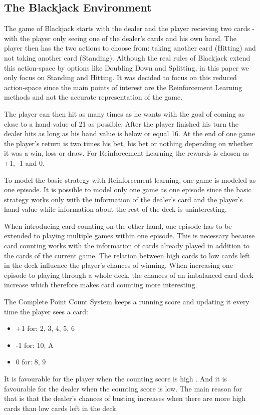 \documentclass[conference]{IEEEtran}
\begin{document}
\subsection{The Blackjack Environment}
The game of Blackjack starts with the dealer and the player recieving two cards - with the player only seeing one of the dealer's cards and his own hand.
The player then has the two actions to choose from: taking another card (Hitting) and not taking another card (Standing). 
Although the real rules of Blackjack extend this action-space by options like Doubling Down and Splitting, in this paper we only focus on Standing and Hitting. 
It was decided to focus on this reduced action-space since the main points of interest are the Reinforcement Learning methods and not the accurate representation of the game. 

The player can then hit as many times as he wants with the goal of coming as close to a hand value of 21 as possible.
After the player finished his turn the dealer hits as long as his hand value is below or equal 16.
At the end of one game the player's return is two times his bet, his bet or nothing depending on whether it was a win, loss or draw. 
For Reinforcement Learning the rewards is chosen as +1, -1 and 0. 

To model the basic strategy with Reinforcement learning, one game is modeled as one episode. 
It is possible to model only one game as one episode since the basic strategy works only with the information of the dealer's card and the player's hand value while information about the rest of the deck is uninteresting.

When introducing card counting on the other hand, one episode has to be extended to playing multiple games within one episode. 
This is necessary because card counting works with the information of cards already played in addition to the cards of the current game.
The relation between high cards to low cards left in the deck influence the player's chances of winning.
When increasing one episode to playing through a whole deck, the chances of an imbalanced card deck increase which therefore makes card counting more interesting. 

The Complete Point Count System \cite{b1} keeps a running score and updating it every time the player sees a card:
\begin{itemize}
	\item +1 for: 2, 3, 4, 5, 6
	\item -1 for: 10, A
	\item 0 for: 8, 9 
\end{itemize}
It is favourable for the player when the counting score is high \cite{b1}.
And it is favourable for the dealer when the counting score is low.
The main reason for that is that the dealer's chances of busting increases when there are more high cards than low cards left in the deck.
\end{document}
